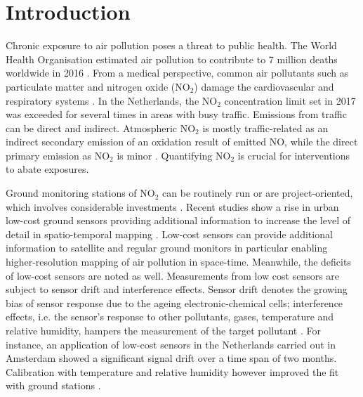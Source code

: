 \documentclass{article}
\begin{document}
\section{Introduction}
Chronic exposure to air pollution poses a threat to public health. The World Health Organisation estimated air pollution to contribute to 7 million deaths worldwide in 2016 \citep{world2018burden}. From a medical perspective, common air pollutants such as particulate matter and nitrogen oxide (NO$_2$) damage the cardiovascular and respiratory systems \citep{anderson2012clearing, pascal2009effets}.  In the Netherlands, the NO$_2$ concentration limit set in 2017 was exceeded for several times in areas with busy traffic\citep{no2}. Emissions from traffic can be direct and indirect. Atmospheric NO$_2$ is mostly traffic-related as an indirect secondary emission of an oxidation result of emitted NO, while the direct primary emission as NO$_2$ is minor \citep{ukno2,no2}. Quantifying NO$_2$ is crucial for interventions to abate exposures.

 Ground monitoring stations of NO$_2$ can be routinely run or are project-oriented, which involves considerable investments \citep{hoek2008review}. Recent studies show a rise in urban low-cost ground sensors providing additional information to increase the level of detail in spatio-temporal mapping \citep{spinelle2015field, schneider2017mapping,isiugo2018assessing}. Low-cost sensors can provide additional information to satellite and regular ground monitors in particular enabling higher-resolution mapping of air pollution in space-time. Meanwhile, the deficits of low-cost sensors are noted as well. Measurements from low cost sensors are subject to sensor drift and interference effects. Sensor drift denotes the growing bias of sensor response due to the ageing electronic-chemical cells; interference effects, i.e. the sensor's response to other pollutants, gases, temperature and relative humidity, hampers the measurement of the target pollutant \citep{van2019calibration}. For instance, an application of low-cost sensors in the Netherlands carried out in Amsterdam showed a significant signal drift over a time span of two months. Calibration with temperature and relative humidity however improved the fit with ground stations \citep{mijling2018field}. 
 
\end{document}
